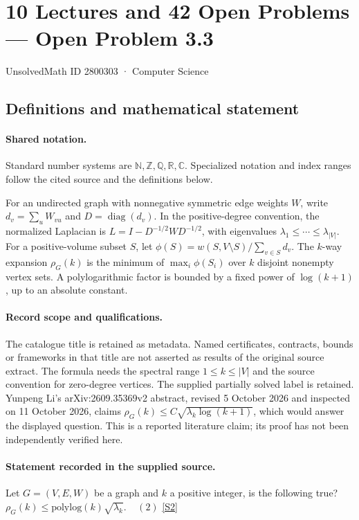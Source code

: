 \documentclass[11pt]{article}
\newcommand{\sref}[2]{\hyperlink{source:#1:#2}{[S#2]}}
\begin{document}
\setcounter{section}{2800302}
\section{10 Lectures and 42 Open Problems — Open Problem 3.3}\label{2800303}
{\small\sffamily UnsolvedMath ID 2800303 · Computer Science}
\subsection{Definitions and mathematical statement}

\paragraph{Shared notation.}Standard number systems are $\mathbb N,\mathbb Z,\mathbb Q,\mathbb R,\mathbb C$. Specialized notation and index ranges follow the cited source and the definitions below.


For an undirected graph with nonnegative symmetric edge weights $W$, write $d_v=\sum_uW_{vu}$ and $D=\operatorname{diag}(d_v)$. In the positive-degree convention, the normalized Laplacian is $L=I-D^{-1/2}WD^{-1/2}$, with eigenvalues $\lambda_1\leq\cdots\leq\lambda_{|V|}$. For a positive-volume subset $S$, let $\phi(S)=w(S,V\setminus S)/\sum_{v\in S}d_v$. The $k$-way expansion $\rho_G(k)$ is the minimum of $\max_i\phi(S_i)$ over $k$ disjoint nonempty vertex sets. A polylogarithmic factor is bounded by a fixed power of $\log(k+1)$, up to an absolute constant.
\paragraph{Record scope and qualifications.}
The catalogue title is retained as metadata. Named certificates, contracts, bounds or frameworks in that title are not asserted as results of the original source extract.
The formula needs the spectral range $1\leq k\leq|V|$ and the source convention for zero-degree vertices. The supplied partially solved label is retained. Yunpeng Li's arXiv:2609.35369v2 abstract, revised 5 October 2026 and inspected on 11 October 2026, claims $\rho_G(k)\leq C\sqrt{\lambda_k\log(k+1)}$, which would answer the displayed question. This is a reported literature claim; its proof has not been independently verified here.
\paragraph{Statement recorded in the supplied source.}
Let ${G=(V,E,W)}$ be a graph and ${k}$ a positive integer, is the following true? $\rho_G(k) \leq \mathrm{polylog}(k) \sqrt{\lambda_k}. \ \ \ \ \ (2)$ \sref{2800303}{2}
\end{document}

